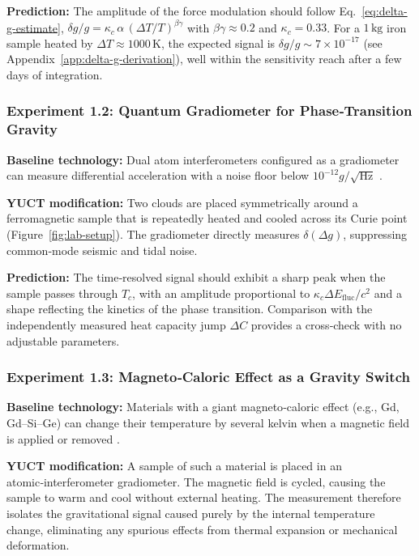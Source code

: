 \documentclass[12pt]{article}
\theoremstyle{remark}
\begin{document}
	\textbf{Prediction:} The amplitude of the force modulation should follow Eq.~\eqref{eq:delta-g-estimate},
	\(\delta g/g = \kappa_c\,\alpha\,(\Delta T/T)^{\beta\gamma}\) with \(\beta\gamma\approx0.2\) and \(\kappa_c=0.33\).  
	For a \(1\,\mathrm{kg}\) iron sample heated by \(\Delta T\approx1000\,\mathrm{K}\), the expected signal is
	\(\delta g/g \sim 7\times10^{-17}\) (see Appendix~\ref{app:delta-g-derivation}), well within the sensitivity reach
	after a few days of integration.
	
	\subsubsection{Experiment 1.2: Quantum Gradiometer for Phase‑Transition Gravity}
	
	\textbf{Baseline technology:} Dual atom interferometers configured as a gradiometer can measure differential
	acceleration with a noise floor below \(10^{-12}g/\sqrt{\mathrm{Hz}}\) \cite{Snadden1998}.
	
	\textbf{YUCT modification:} Two clouds are placed symmetrically around a ferromagnetic sample that is repeatedly
	heated and cooled across its Curie point (Figure~\ref{fig:lab-setup}).  
	The gradiometer directly measures \(\delta(\Delta g)\), suppressing common‑mode seismic and tidal noise.
	
	\textbf{Prediction:} The time‑resolved signal should exhibit a sharp peak when the sample passes through \(T_c\),
	with an amplitude proportional to \(\kappa_c \Delta E_{\mathrm{fluc}}/c^2\) and a shape reflecting the kinetics of the
	phase transition.  
	Comparison with the independently measured heat capacity jump \(\Delta C\) provides a cross‑check with no adjustable
	parameters.
	
	\subsubsection{Experiment 1.3: Magneto‑Caloric Effect as a Gravity Switch}
	
	\textbf{Baseline technology:} Materials with a giant magneto‑caloric effect (e.g., Gd, Gd–Si–Ge) can change their
	temperature by several kelvin when a magnetic field is applied or removed \cite{Gschneidner1999}.
	
	\textbf{YUCT modification:} A sample of such a material is placed in an atomic‑interferometer gradiometer.  
	The magnetic field is cycled, causing the sample to warm and cool without external heating.  
	The measurement therefore isolates the gravitational signal caused purely by the internal temperature change,
	eliminating any spurious effects from thermal expansion or mechanical deformation.
	
\end{document}
